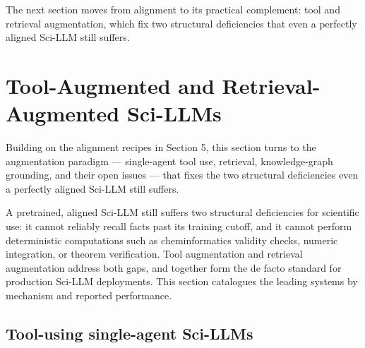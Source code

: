 \documentclass{article}
\begin{document}
The next section moves from alignment to its practical complement: tool and retrieval augmentation, which fix two structural deficiencies that even a perfectly aligned Sci-LLM still suffers.

\section{Tool-Augmented and Retrieval-Augmented Sci-LLMs}\label{tool-augmented-and-retrieval-augmented-sci-llms}

Building on the alignment recipes in Section 5, this section turns to the augmentation paradigm --- single-agent tool use, retrieval, knowledge-graph grounding, and their open issues --- that fixes the two structural deficiencies even a perfectly aligned Sci-LLM still suffers.

A pretrained, aligned Sci-LLM still suffers two structural deficiencies for scientific use: it cannot reliably recall facts past its training cutoff, and it cannot perform deterministic computations such as cheminformatics validity checks, numeric integration, or theorem verification. Tool augmentation and retrieval augmentation address both gaps, and together form the de facto standard for production Sci-LLM deployments. This section catalogues the leading systems by mechanism and reported performance.

\subsection{Tool-using single-agent Sci-LLMs}\label{tool-using-single-agent-sci-llms}
\end{document}
